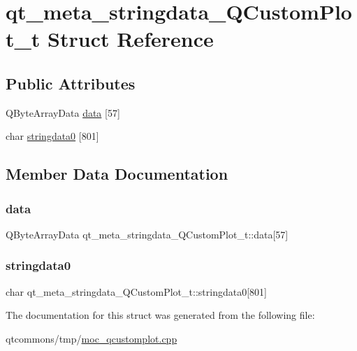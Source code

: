 \hypertarget{structqt__meta__stringdata___q_custom_plot__t}{}\section{qt\+\_\+meta\+\_\+stringdata\+\_\+\+Q\+Custom\+Plot\+\_\+t Struct Reference}
\label{structqt__meta__stringdata___q_custom_plot__t}
\subsection*{Public Attributes}
\begin{DoxyCompactItemize}
\item 
Q\+Byte\+Array\+Data \mbox{\hyperlink{structqt__meta__stringdata___q_custom_plot__t_a8187585851e92f04305f8ffa2feb1f26}{data}} \mbox{[}57\mbox{]}
\item 
char \mbox{\hyperlink{structqt__meta__stringdata___q_custom_plot__t_a2e4c70ebd0898594572199fea151f546}{stringdata0}} \mbox{[}801\mbox{]}
\end{DoxyCompactItemize}


\subsection{Member Data Documentation}
\mbox{\label{structqt__meta__stringdata___q_custom_plot__t_a8187585851e92f04305f8ffa2feb1f26}} 
\subsubsection{\texorpdfstring{data}{data}}
{\footnotesize\ttfamily Q\+Byte\+Array\+Data qt\+\_\+meta\+\_\+stringdata\+\_\+\+Q\+Custom\+Plot\+\_\+t\+::data\mbox{[}57\mbox{]}}

\mbox{\label{structqt__meta__stringdata___q_custom_plot__t_a2e4c70ebd0898594572199fea151f546}} 
\subsubsection{\texorpdfstring{stringdata0}{stringdata0}}
{\footnotesize\ttfamily char qt\+\_\+meta\+\_\+stringdata\+\_\+\+Q\+Custom\+Plot\+\_\+t\+::stringdata0\mbox{[}801\mbox{]}}



The documentation for this struct was generated from the following file\+:\begin{DoxyCompactItemize}
\item 
qtcommons/tmp/\mbox{\hyperlink{moc__qcustomplot_8cpp}{moc\+\_\+qcustomplot.\+cpp}}\end{DoxyCompactItemize}
